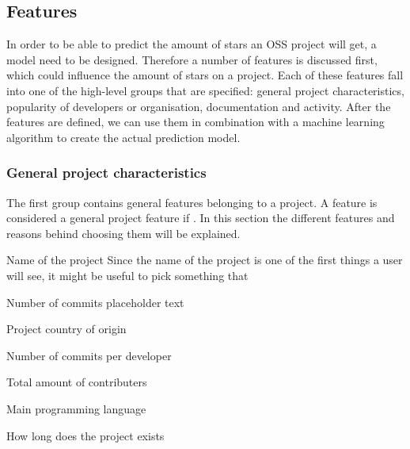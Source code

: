         
        
    
    
    \subsection{Features}
    In order to be able to predict the amount of stars an OSS project will get, a model need to be designed.
    Therefore a number of features is discussed first, which could influence the amount of stars on a project.
    Each of these features fall into one of the high-level groups that are specified: general project characteristics, popularity of developers or organisation, documentation and activity.
    After the features are defined, we can use them in combination with a machine learning algorithm to create the actual prediction model.

    \subsubsection{General project characteristics}
    The first group contains general features belonging to a project. 
    A feature is considered a general project feature if .
    In this section the different features and reasons behind choosing them will be explained.\\
    \begin{LaTeXdescription}
        \item[Name of the project]
        Since the name of the project is one of the first things a user will see, it might be useful to pick something that 
        \item[Number of commits]
        placeholder text 
        \item[Project country of origin]
        \item[Number of commits per developer]
        \item[Total amount of contributers]
        \item[Main programming language]
        \item[How long does the project exists]
    \end{LaTeXdescription}

